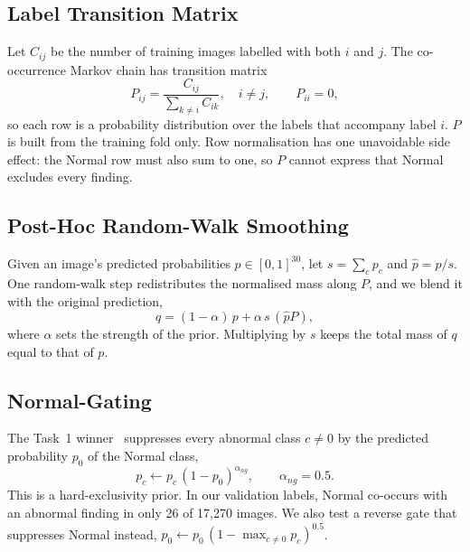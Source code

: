 \documentclass[conference]{IEEEtran}
\begin{document}
\subsection{Label Transition Matrix}
Let $C_{ij}$ be the number of training images labelled with both $i$ and $j$. The co-occurrence Markov chain has transition matrix
\begin{equation}
P_{ij} = \frac{C_{ij}}{\sum_{k \neq i} C_{ik}}, \quad i \neq j, \qquad P_{ii} = 0,
\label{eq:transition}
\end{equation}
so each row is a probability distribution over the labels that accompany label $i$. $P$ is built from the training fold only. Row normalisation has one unavoidable side effect: the Normal row must also sum to one, so $P$ cannot express that Normal excludes every finding.

\subsection{Post-Hoc Random-Walk Smoothing}
\label{sec:smoothing}
Given an image's predicted probabilities $p \in [0,1]^{30}$, let $s = \sum_c p_c$ and $\hat{p} = p / s$. One random-walk step redistributes the normalised mass along $P$, and we blend it with the original prediction,
\begin{equation}
q = (1 - \alpha)\, p + \alpha\, s\, (\hat{p} P),
\label{eq:smoothing}
\end{equation}
where $\alpha$ sets the strength of the prior. Multiplying by $s$ keeps the total mass of $q$ equal to that of $p$.

\subsection{Normal-Gating}
\label{sec:gating}
The Task~1 winner~\cite{b15} suppresses every abnormal class $c \neq 0$ by the predicted probability $p_0$ of the Normal class,
\begin{equation}
p_c \leftarrow p_c\,(1 - p_0)^{\alpha_{ng}}, \qquad \alpha_{ng} = 0.5.
\label{eq:gating}
\end{equation}
This is a hard-exclusivity prior. In our validation labels, Normal co-occurs with an abnormal finding in only 26 of 17,270 images. We also test a reverse gate that suppresses Normal instead, $p_0 \leftarrow p_0\,(1 - \max_{c \neq 0} p_c)^{0.5}$.
\end{document}
